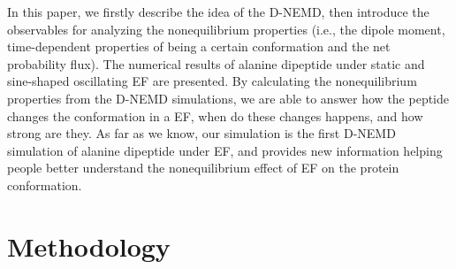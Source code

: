 \documentclass[aip,jcp,a4paper,preprint,onecolumn]{revtex4-1}
\begin{document}
In this paper, we firstly describe the idea of the D-NEMD, then
introduce the
observables for analyzing the nonequilibrium properties
(i.e., the dipole moment, time-dependent properties of being a certain
conformation and the net
probability flux). The numerical results of alanine
dipeptide under static and sine-shaped oscillating EF are
presented. By calculating the nonequilibrium properties from the D-NEMD
simulations, we are able to answer how the peptide
changes the conformation in a EF, when do these changes happens,
and how strong are they.
As far as we know, our simulation is the first D-NEMD simulation
of alanine dipeptide under EF, and provides new
information helping people better understand the nonequilibrium
effect of EF on the protein conformation.



\section{Methodology}
\end{document}
